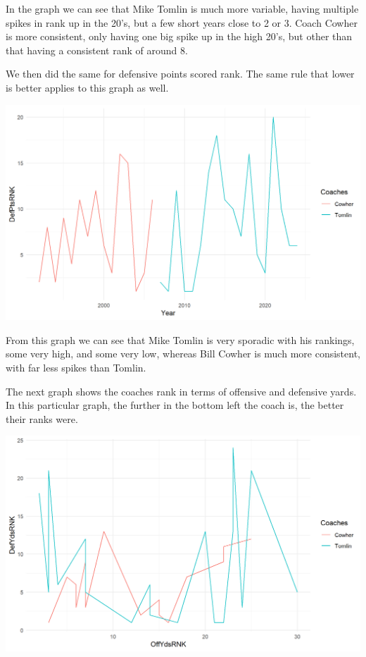 \documentclass[
  letterpaper,
  DIV=11,
  numbers=noendperiod]{scrartcl}
\begin{document}
\begin{itemize}
  In the graph we can see that Mike Tomlin is much more variable, having
  multiple spikes in rank up in the 20's, but a few short years close to
  2 or 3. Coach Cowher is more consistent, only having one big spike up
  in the high 20's, but other than that having a consistent rank of
  around 8.

  We then did the same for defensive points scored rank. The same rule
  that lower is better applies to this graph as well.

  \includegraphics{images/clipboard-3632505765.png}

  From this graph we can see that Mike Tomlin is very sporadic with his
  rankings, some very high, and some very low, whereas Bill Cowher is
  much more consistent, with far less spikes than Tomlin.

  The next graph shows the coaches rank in terms of offensive and
  defensive yards. In this particular graph, the further in the bottom
  left the coach is, the better their ranks were.

  \includegraphics{images/clipboard-3198986412.png}


\end{itemize}
\end{document}
